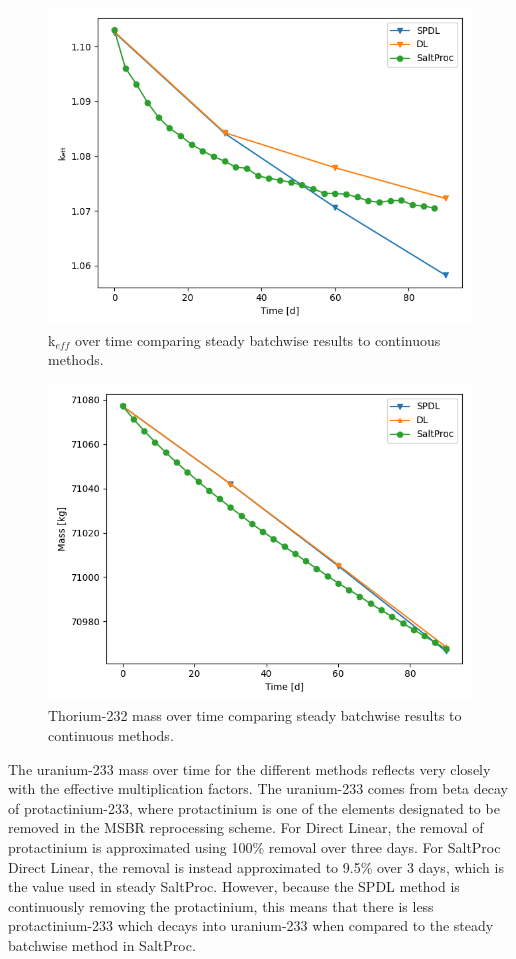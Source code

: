 \begin{figure}[H]
  \centering
  \includegraphics[scale=0.7]{images/soln-1-keff.png}
  \caption{k$_{eff}$ over time comparing steady batchwise results to continuous methods.}
   \label{fig:steady-compare-keff}
\end{figure}

\begin{figure}[H]
  \centering
  \includegraphics[scale=0.7]{images/soln-1-th232.png}
  \caption{Thorium-232 mass over time comparing steady batchwise results to continuous methods.}
   \label{fig:steady-compare-th232}
\end{figure}

The uranium-233 mass over time for the different methods reflects very closely with the effective multiplication factors. The uranium-233 comes from beta decay of protactinium-233, where protactinium is one of the elements designated to be removed in the MSBR reprocessing scheme. For Direct Linear, the removal of protactinium is approximated using 100\% removal over three days. For SaltProc Direct Linear, the removal is instead approximated to 9.5\% over 3 days, which is the value used in steady SaltProc. However, because the SPDL method is continuously removing the protactinium, this means that there is less protactinium-233 which decays into uranium-233 when compared to the steady batchwise method in SaltProc. 

